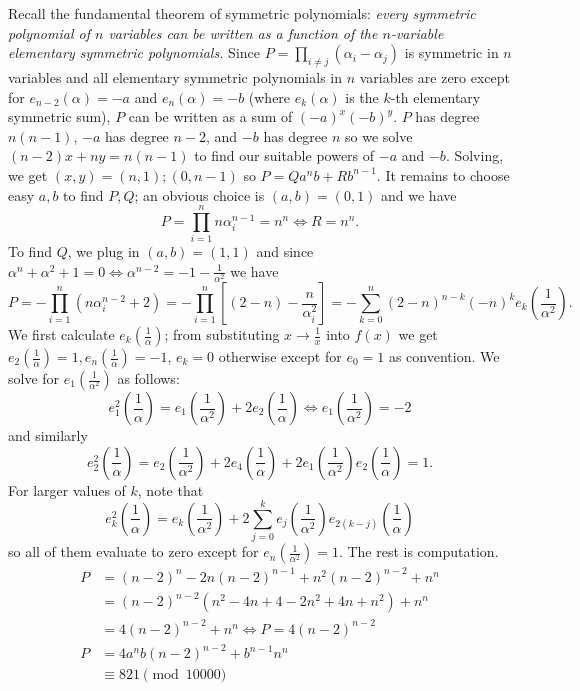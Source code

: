 \begin{solution}\hfil\medskip

	Recall the fundamental theorem of symmetric polynomials: \textit{every symmetric polynomial of $n$ variables can be written as a function of the $n$-variable elementary symmetric polynomials.}
	Since $P = \prod_{i \neq j} \left(\alpha_i - \alpha_j\right)$ is symmetric in $n$ variables and all elementary symmetric polynomials in $n$ variables
	are zero except for $e_{n - 2}\left(\alpha\right) = -a$ and $e_n\left(\alpha\right) = -b$ (where $e_k(\alpha)$ is the $k$-th elementary symmetric sum), $P$ can be written as a sum of $(-a)^x(-b)^y$.
	$P$ has degree $n(n - 1)$, $-a$ has degree $n - 2$, and $-b$ has degree $n$ so we solve $(n - 2)x + ny = n(n - 1)$ to find our suitable powers of $-a$ and $-b$.
	Solving, we get $(x, y) = (n, 1); (0, n - 1)$ so $P = Qa^nb + Rb^{n - 1}$. It remains to choose easy $a, b$ to find $P, Q$; an obvious choice is $(a, b) = (0, 1)$
	and we have $$P = \prod_{i = 1}^n n \alpha_i^{n - 1} = n^n \iff R = n^n.$$ To find $Q$, we plug in $(a, b) = (1, 1)$ and since 
	$\alpha^n + \alpha^2 + 1 = 0 \iff \alpha^{n - 2} = - 1 - \frac{1}{\alpha^2}$ we have
	$$P = -\prod_{i = 1}^n \left(n \alpha_i^{n - 2} + 2\right) = - \prod_{i = 1}^n \left[(2 - n) - \dfrac{n}{\alpha_i^2}\right] = - \sum_{k = 0}^n (2 - n)^{n - k}(-n)^k e_k\left(\dfrac{1}{\alpha^2}\right).$$
	We first calculate $e_k\left(\frac{1}{\alpha}\right)$; from substituting $x \to \frac{1}{x}$ into $f(x)$ we get 
	$e_2\left(\frac{1}{\alpha}\right) = 1, e_n\left(\frac{1}{\alpha}\right) = -1$, $e_k = 0$ otherwise except for $e_0 = 1$ as convention. We solve for $e_1\left(\frac{1}{\alpha^2}\right)$ as follows:
	$$e_1^2\left(\dfrac{1}{\alpha}\right) = e_1\left(\dfrac{1}{\alpha^2}\right) + 2e_2\left(\dfrac{1}{\alpha}\right) \iff e_1\left(\dfrac{1}{\alpha^2}\right) = -2$$
	and similarly
	$$e_2^2\left(\dfrac{1}{\alpha}\right) = e_2\left(\dfrac{1}{\alpha^2}\right) + 2e_4\left(\dfrac{1}{\alpha}\right) + 2e_1\left(\dfrac{1}{\alpha^2}\right)e_2\left(\dfrac{1}{\alpha}\right) = 1.$$
	For larger values of $k$, note that 
	$$e_k^2\left(\dfrac{1}{\alpha}\right) = e_k\left(\dfrac{1}{\alpha^2}\right) + 2 \sum_{j = 0}^{k} e_j\left(\dfrac{1}{\alpha^2}\right)e_{2(k - j)}\left(\dfrac{1}{\alpha}\right)$$
	so all of them evaluate to zero except for $e_n\left(\frac{1}{\alpha^2}\right) = 1$. The rest is computation.
	\begin{align*}
		P &= (n - 2)^n - 2n(n - 2)^{n - 1} + n^2(n - 2)^{n - 2} + n^n \\
		&= (n - 2)^{n - 2}\left(n^2 - 4n + 4 - 2n^2 + 4n + n^2\right) + n^n \\
		&= 4(n - 2)^{n - 2} + n^n \iff P = 4(n - 2)^{n - 2} \\
		P &= 4a^nb(n - 2)^{n - 2} + b^{n - 1}n^n \\
		&\equiv \boxed{821} \pmod{10000}
	\end{align*}
\end{solution}\bigskip